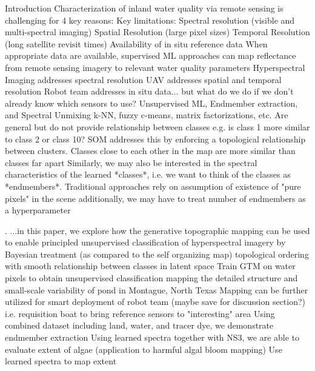 \documentclass{article}
\begin{document}
\begin{outline}[enumerate]
\1 Introduction
    \2 Characterization of inland water quality via remote sensing is challenging for 4 key reasons:
        \3 Key limitations:
            \4 Spectral resolution (visible and multi-spectral imaging)
            \4 Spatial Resolution (large pixel sizes)
            \4 Temporal Resolution (long satellite revisit times)
            \4 Availability of in situ reference data
        \3 When appropriate data are available, supervised ML approaches can map reflectance from remote sensing imagery to relevant water quality parameters
    \2 Hyperspectral Imaging addresses spectral resolution
    \2 UAV addresses spatial and temporal resolution
    \2 Robot team addresses in situ data... but what do we do if we don't already know which sensors to use? 
    \2 Unsupervised ML, Endmember extraction, and Spectral Unmixing
        \3 k-NN, fuzzy c-means, matrix factorizations, etc.
            \4 Are general but do not provide relationship between classes e.g. is class 1 more similar to class 2 or class 10?
        \3 SOM addresses this by enforcing a topological relationship between clusters. Classes close to each other in the map are more similar than classes far apart
        \3 Similarly, we may also be interested in the spectral characteristics of the learned *classes*, i.e. we want to think of the classes as *endmembers*.
            \4 Traditional approaches rely on assumption of existence of "pure pixels" in the scene
            \4 additionally, we may have to treat number of endmembers as a hyperparameter

    \2. ...in this paper, we explore how the generative topographic mapping can be used to
        \3 enable principled unsupervised classification of hyperspectral imagery by
            \4 Bayesian treatment (as compared to the self organizing map)
            \4 topological ordering with smooth relationship between classes in latent space
        \3 Train GTM on water pixels to obtain unsupervised classification mapping the detailed structure and small-scale variability of pond in Montague, North Texas
        \3 Mapping can be further utilized for smart deployment of robot team (maybe save for discussion section?) i.e. requisition boat to bring reference sensors to "interesting" area
        \3 Using combined dataset including land, water, and tracer dye, we demonstrate endmember extraction
        \3 Using learned spectra together with NS3, we are able to evaluate extent of algae (application to harmful algal bloom mapping)
        \3 Use learned spectra to map extent



\end{outline}
\end{document}
